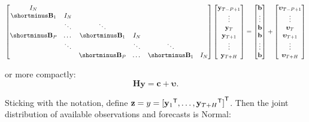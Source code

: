 \documentclass[notitlepage,a4paper,12pt]{article}
\newcommand{\transpose}[1]{{#1}^{\sf{T}}}
\begin{document}
\begin{equation*}
    \begin{bmatrix}
        I_N \\
        \shortminus\mathbf{B}_1 & I_N \\
        & \ddots & \ddots & \\
        \shortminus\mathbf{B}_{P} & \dots & \shortminus\mathbf{B}_1 & I_N & & \\
        & \ddots &  & \ddots & \ddots & \\
        & & \shortminus\mathbf{B}_{P} & \dots & \shortminus\mathbf{B}_1 & I_N       
    \end{bmatrix}
    \begin{bmatrix}
        \mathbf{y}_{T-P+1} \\
        \vdots \\
        \mathbf{y}_{T} \\
        \mathbf{y}_{T+1} \\
        \vdots \\
        \mathbf{y}_{T+H} 
    \end{bmatrix}
    =
    \begin{bmatrix}
        \mathbf{b} \\
        \vdots \\
        \mathbf{b} \\
        \mathbf{b} \\
        \vdots \\
        \mathbf{b} 
    \end{bmatrix}
    +
    \begin{bmatrix}
        \boldsymbol{\upsilon}_{T-P+1} \\
        \vdots \\
        \boldsymbol{\upsilon}_{T} \\
        \boldsymbol{\upsilon}_{T+1} \\
        \vdots \\
        \boldsymbol{\upsilon}_{T+H} 
    \end{bmatrix}
\end{equation*}

or more compactly:
\begin{equation*}
    \mathbf{H} \mathbf{y} = \mathbf{c} + \boldsymbol{\upsilon}.
\end{equation*}

Sticking with the notation, define $\mathbf{z}={y} = \transpose{[\transpose{\mathbf{y}_1}, \dots, \transpose{\mathbf{y}_{T+H}}]}$. Then the joint distribution of available observations and forecasts is Normal:
\end{document}

